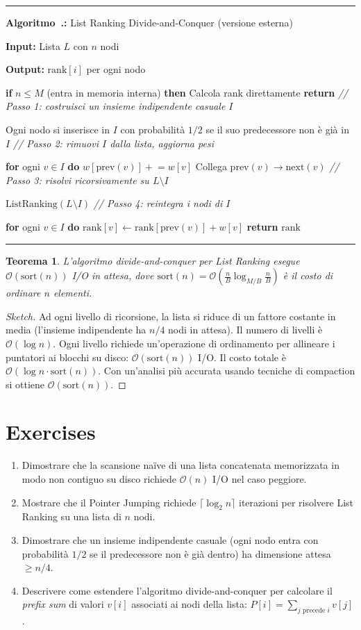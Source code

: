 \documentclass[12pt, a4paper, oneside]{book}
\newcounter{algocf}[chapter]
\renewcommand{\thealgocf}{\thechapter.\arabic{algocf}}
\newenvironment{algorithm}[1][H]{%
  \refstepcounter{algocf}%
  \par\medskip\noindent\rule{\linewidth}{0.4pt}\par\smallskip
}{%
  \par\smallskip\noindent\rule{\linewidth}{0.4pt}\par\medskip
}
\newcommand{\algcaption}[1]{\noindent\textbf{Algoritmo~\thealgocf:} #1\par\smallskip}
\newcommand{\KwIn}[1]{\noindent\textbf{Input:} #1\par}
\newcommand{\KwOut}[1]{\noindent\textbf{Output:} #1\par}
\newcommand{\tcp}[1]{{\color{gray}\textit{// #1}}\par}
\newcommand{\For}[1]{\noindent\textbf{for} #1 \textbf{do}}
\newcommand{\If}[1]{\noindent\textbf{if} #1 \textbf{then}}
\newcommand{\Return}[1]{\noindent\textbf{return} #1}
\theoremstyle{plain}
\newtheorem{teorema}{Teorema}[chapter]
\theoremstyle{definition}
\theoremstyle{remark}
\newcommand{\OO}[1]{\mathcal{O}\!\left(#1\right)}
\newcommand{\sort}{\mathrm{sort}}
\begin{document}
\begin{algorithm}[H]
\algcaption{List Ranking Divide-and-Conquer (versione esterna)}
\KwIn{Lista $L$ con $n$ nodi}
\KwOut{$\mathrm{rank}[i]$ per ogni nodo}
\If{$n \le M$ (entra in memoria interna)}{
  Calcola rank direttamente\;
  \Return\;
}
\tcp{Passo 1: costruisci un insieme indipendente casuale $I$}
Ogni nodo si inserisce in $I$ con probabilità $1/2$ se il suo predecessore non è già in $I$\;
\tcp{Passo 2: rimuovi $I$ dalla lista, aggiorna pesi}
\For{ogni $v \in I$}{
  $w[\mathrm{prev}(v)] \mathrel{+}= w[v]$\;
  Collega $\mathrm{prev}(v) \to \mathrm{next}(v)$\;
}
\tcp{Passo 3: risolvi ricorsivamente su $L \setminus I$}
$\mathrm{ListRanking}(L \setminus I)$\;
\tcp{Passo 4: reintegra i nodi di $I$}
\For{ogni $v \in I$}{
  $\mathrm{rank}[v] \leftarrow \mathrm{rank}[\mathrm{prev}(v)] + w[v]$\;
}
\Return{$\mathrm{rank}$}\;
\end{algorithm}

\begin{teorema}
L'algoritmo divide-and-conquer per List Ranking esegue $\OO{\sort(n)}$ I/O in attesa, dove $\sort(n) = \OO{\frac{n}{B} \log_{M/B} \frac{n}{B}}$ è il costo di ordinare $n$ elementi.
\end{teorema}

\begin{proof}[Sketch]
Ad ogni livello di ricorsione, la lista si riduce di un fattore costante in media (l'insieme indipendente ha $n/4$ nodi in attesa). Il numero di livelli è $\OO{\log n}$. Ogni livello richiede un'operazione di ordinamento per allineare i puntatori ai blocchi su disco: $\OO{\sort(n)}$ I/O. Il costo totale è $\OO{\log n \cdot \sort(n)}$. Con un'analisi più accurata usando tecniche di compaction si ottiene $\OO{\sort(n)}$.
\end{proof}

\section{Exercises}

\begin{enumerate}
  \item Dimostrare che la scansione naïve di una lista concatenata memorizzata in modo non contiguo su disco richiede $\OO{n}$ I/O nel caso peggiore.
  \item Mostrare che il Pointer Jumping richiede $\lceil \log_2 n \rceil$ iterazioni per risolvere List Ranking su una lista di $n$ nodi.
  \item Dimostrare che un insieme indipendente casuale (ogni nodo entra con probabilità $1/2$ se il predecessore non è già dentro) ha dimensione attesa $\ge n/4$.
  \item Descrivere come estendere l'algoritmo divide-and-conquer per calcolare il \emph{prefix sum} di valori $v[i]$ associati ai nodi della lista: $P[i] = \sum_{j \text{ precede } i} v[j]$.
\end{enumerate}
\end{document}
